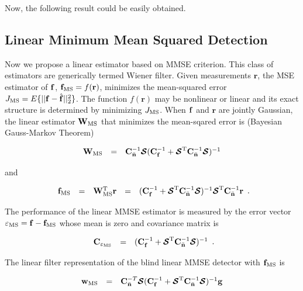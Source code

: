 \documentclass[a4paper,11pt,fleqn]{article}
\newcommand{\br}{{\mathbf r}}
\newcommand{\bC}{{\bf C}}
\newcommand{\bg}{{\bf g}}
\newcommand{\bn}{{\bf n}}
\newcommand{\bw}{{\bf w}}
\newcommand{\bbf}{{\bf f}}
\newcommand{\bW}{{\bf W}}
\newcommand{\bcS}{{\mbox {\boldmath ${\cal S}$}}}
\begin{document}
Now, the following result could be easily obtained.


\subsection{Linear Minimum Mean Squared Detection}
Now we propose a linear estimator based on MMSE criterion. This
class of estimators are generically termed Wiener filter. Given
measurements $\br$, the MSE estimator of $\bbf$, ${\bbf}_{\rm MS}
= f( \br )$, minimizes the mean-squared error $J_{\rm
MS}=E\{||\bbf-\hat{\bbf}||_2^2\}$. The function $f(\br)$ may be
nonlinear or linear and its exact structure is determined by
minimizing $J_{\rm MS}$. When $\bbf$ and $\br$ are jointly
Gaussian, the linear estimator $\bW_{\rm MS}$ that minimizes the
mean-sqared error is (Bayesian Gauss-Markov Theorem)

\begin{equation}
\begin{array}{rcl}
{\bW}_{\rm MS} &=&
\bC_{\bar{\bn}}^{-1}\bcS(\bC_{\bbf}^{-1}+\bcS^{\rm
T}\bC_{\bar{\bn}}^{-1}\bcS)^{-1}
\end{array}\label{W_MSE}
\end{equation}

\noindent and

\begin{equation}
\begin{array}{rcccl}
{\bbf}_{\rm MS} &=&{\bW}_{\rm MS}^{\rm T}\br
&=&(\bC_{\bbf}^{-1}+\bcS^{\rm
T}\bC_{\bar{\bn}}^{-1}\bcS)^{-1}\bcS^{\rm
T}\bC_{\bar{\bn}}^{-1}\br
\end{array}. \label{MSE}
\end{equation}

\noindent The performance of the linear MMSE estimator is measured
by the error vector $\mathbf{\varepsilon_{\rm MS}}=\bbf-\bbf_{\rm
MS}$ whose mean is zero and covariance matrix is

\begin{equation}
\begin{array}{rcl}
\bC_{\mathbf{\varepsilon_{\rm MS}}} &=& (\bC_{\bbf}^{-1}+\bcS^{\rm
T}\bC_{\bar{\bn}}^{-1}\bcS)^{-1}
\end{array}.
\end{equation}

The linear filter representation of the blind linear MMSE detector
with $\bbf_{\rm MS}$ is

\begin{equation}
\begin{array}{rcl}
{\bw}_{\rm MS}&=&
\bC_{\bar{\bn}}^{-T}\bcS(\bC_{\bbf}^{-1}+\bcS^{\rm
T}\bC_{\bar{\bn}}^{-1}\bcS)^{-1}\bg
\end{array} \label{w_MSE}
\end{equation}
\end{document}
